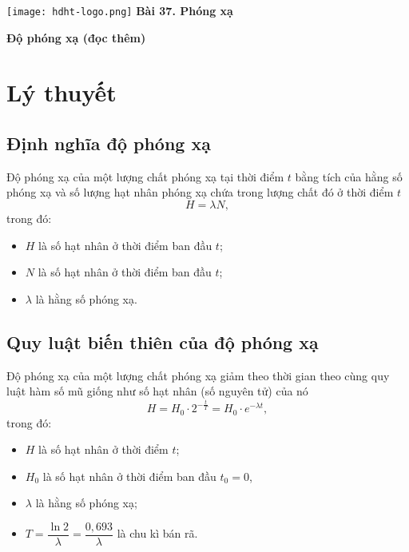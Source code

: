 \newcommand{\chapter}[2][]{
	\newcommand{\chapname}{#2}
	\begin{flushleft}
		\begin{minipage}[t]{\linewidth}
			\texttt{[image: hdht-logo.png]}
			\hspace{0pt}	
			\sffamily\bfseries\large Bài  37. Phóng xạ
			\begin{flushleft}
				\huge\bfseries #1
			\end{flushleft}
		\end{minipage}
	\end{flushleft}
	\vspace{1cm}
	\normalfont\normalsize
}
\chapter[Độ phóng xạ (đọc thêm)]{Độ phóng xạ (đọc thêm)}
\section{Lý thuyết}

\subsection{Định nghĩa độ phóng xạ}
	Độ phóng xạ của một lượng chất phóng xạ tại thời điểm $t$ bằng tích của hằng số phóng xạ và số lượng hạt nhân phóng xạ chứa trong lượng chất đó ở thời điểm $t$
	\begin{equation}
	H=\lambda N,
	\end{equation}
	trong đó:
	\begin{itemize}
		\item $H$ là số hạt nhân ở thời điểm ban đầu $t$;
		\item $N$ là số hạt nhân ở thời điểm ban đầu $t$;
		\item $\lambda$ là hằng số phóng xạ.
	\end{itemize}

\subsection{Quy luật biến thiên của độ phóng xạ}
	Độ phóng xạ của một lượng chất phóng xạ giảm theo thời gian theo cùng quy luật hàm số mũ giống như số hạt nhân (số nguyên tử) của nó
	\begin{equation}
		H=H_0\cdot 2^{-\frac{t}{T}}=H_0\cdot e^{-\lambda t},
	\end{equation}
	trong đó:
		\begin{itemize}
		\item $H$ là số hạt nhân ở thời điểm $t$;
		\item $H_0$ là số hạt nhân ở thời điểm ban đầu $t_0=0$,
		\item $\lambda$ là hằng số phóng xạ;
		\item $T=\dfrac{\ln2}{\lambda}=\dfrac{0,693}{\lambda}$ là chu kì bán rã.
	\end{itemize}

